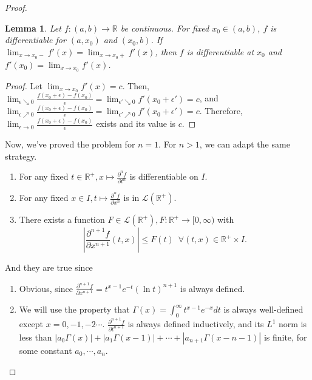 \documentclass{article}
\newtheorem{lemma}{Lemma}
\begin{document}
\begin{enumerate}[font = \Large\bfseries\itshape\space, leftmargin = 3mm, labelsep = 3mm]
\begin{proof}
\begin{lemma}
Let $f : (a,b) \rightarrow \mathbb{R}$ be continuous.
For fixed $x_0 \in (a,b)$, $f$ is differentiable for $(a,x_0)$ and $(x_0, b)$.
If $\lim_{x\rightarrow x_0-}f'(x) = \lim_{x\rightarrow x_0+}f'(x)$, then $f$ is differentiable at $x_0$ and
$f'(x_0) = \lim_{x\rightarrow x_0}f'(x)$.
\end{lemma}
\begin{proof}
Let $\lim_{x\rightarrow x_0}f'(x) = c$. Then,
$\lim_{\epsilon\searrow 0}\frac{f(x_0+\epsilon)-f(x_0)}{\epsilon} = \lim_{\epsilon'\searrow 0}f'(x_0+\epsilon') = c$, and
$\lim_{\epsilon\nearrow 0}\frac{f(x_0+\epsilon)-f(x_0)}{\epsilon} = \lim_{\epsilon'\nearrow 0}f'(x_0+\epsilon') = c$.
Therefore, $\lim_{\epsilon\rightarrow 0}\frac{f(x_0+\epsilon)-f(x_0)}{\epsilon}$ exists and its value is $c$.
\end{proof}

Now, we've proved the problem for $n = 1$.
For $n > 1$, we can adapt the same strategy.
\begin{enumerate}[label=(\arabic*)]
\item
For any fixed $t \in \mathbb{R}^+, x \mapsto \frac{\partial^n f}{\partial t^n}$ is differentiable on $I$.

\item
For any fixed $x \in I, t \mapsto \frac{\partial^n f}{\partial x^n}$ is in $\mathcal{L}(\mathbb{R^+})$.

\item
There exists a function $F \in \mathcal{L}(\mathbb{R^+}), F : \mathbb{R}^+ \rightarrow [0,\infty)$ with
$$
\left| \frac{\partial^{n+1} f}{\partial x^{n+1}}(t,x) \right| \leq F(t) \enspace \forall (t,x) \in \mathbb{R^+} \times I.
$$
\end{enumerate}
And they are true since
\begin{enumerate}[label=(\arabic*)]
\item
Obvious, since $\frac{\partial^{n+1} f}{\partial x^{n+1}} = t^{x-1}e^{-t} (\ln t)^{n+1}$ is always defined.

\item
We will use the property that $\Gamma(x) = \int_0^\infty t^{x-1} e^{-x}dt$ is always well-defined except $x = 0, -1, -2 \cdots$.
$\frac{\partial^{n+1} f}{\partial t^{n+1}}$ is always defined inductively, and its $L^1$ norm is less than
$|a_0 \Gamma(x)| + |a_1 \Gamma(x-1)| + \cdots + |a_{n+1} \Gamma(x-n-1)|$ is finite, for some constant $a_0, \cdots, a_n$.


\end{enumerate}
\end{proof}
\end{enumerate}
\end{document}
